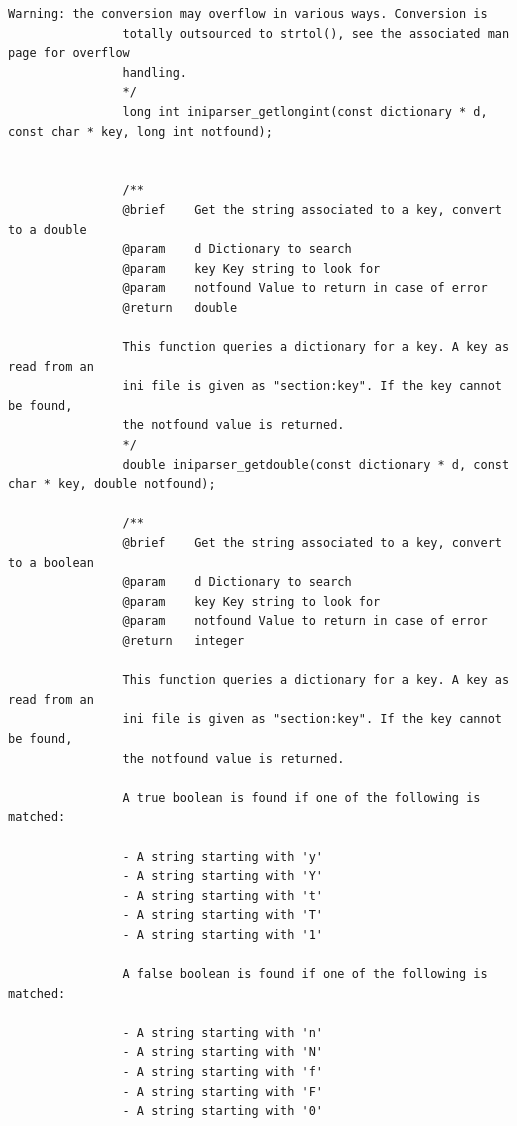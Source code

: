 \documentclass{article}
\begin{document}
\begin{Verbatim}[gobble=8]
                Warning: the conversion may overflow in various ways. Conversion is
                totally outsourced to strtol(), see the associated man page for overflow
                handling.
                */
                long int iniparser_getlongint(const dictionary * d, const char * key, long int notfound);
                
                
                /**
                @brief    Get the string associated to a key, convert to a double
                @param    d Dictionary to search
                @param    key Key string to look for
                @param    notfound Value to return in case of error
                @return   double
                
                This function queries a dictionary for a key. A key as read from an
                ini file is given as "section:key". If the key cannot be found,
                the notfound value is returned.
                */
                double iniparser_getdouble(const dictionary * d, const char * key, double notfound);
                
                /**
                @brief    Get the string associated to a key, convert to a boolean
                @param    d Dictionary to search
                @param    key Key string to look for
                @param    notfound Value to return in case of error
                @return   integer
                
                This function queries a dictionary for a key. A key as read from an
                ini file is given as "section:key". If the key cannot be found,
                the notfound value is returned.
                
                A true boolean is found if one of the following is matched:
                
                - A string starting with 'y'
                - A string starting with 'Y'
                - A string starting with 't'
                - A string starting with 'T'
                - A string starting with '1'
                
                A false boolean is found if one of the following is matched:
                
                - A string starting with 'n'
                - A string starting with 'N'
                - A string starting with 'f'
                - A string starting with 'F'
                - A string starting with '0'
                

\end{Verbatim}
\end{document}
